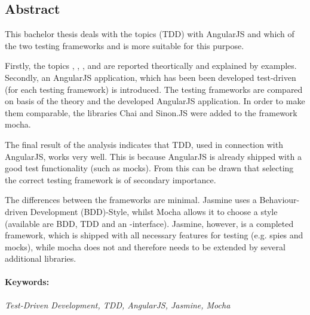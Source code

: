 \subsection*{Abstract}
\vspace{0.5cm}

This bachelor thesis deals with the topics  (TDD) with AngularJS and which of the two testing frameworks  and  is more suitable for this purpose.

Firstly, the topics , , ,  and  are reported theortically and explained by examples. 
Secondly, an AngularJS application, which has been been developed test-driven (for each testing framework) is introduced. The testing frameworks are compared on basis of the theory and the developed AngularJS application. In order to make them comparable, the libraries Chai and Sinon.JS were added to the framework mocha.

The final result of the analysis indicates that TDD, used in connection with AngularJS, works very well. This is because AngularJS is already shipped with a good test functionality (such as mocks). From this can be drawn that selecting the correct testing framework is of secondary importance.

The differences between the frameworks are minimal.
Jasmine uses a Behaviour-driven Development (BDD)-Style, whilst Mocha allows it to choose a style (available are BDD, TDD and an -interface). Jasmine, however, is a completed framework, which is shipped with all necessary features for testing (e.g. spies and mocks), while mocha does not and therefore needs to be extended by several additional libraries.

\paragraph{Keywords:}
\textit{Test-Driven Development, TDD, AngularJS, Jasmine, Mocha}


